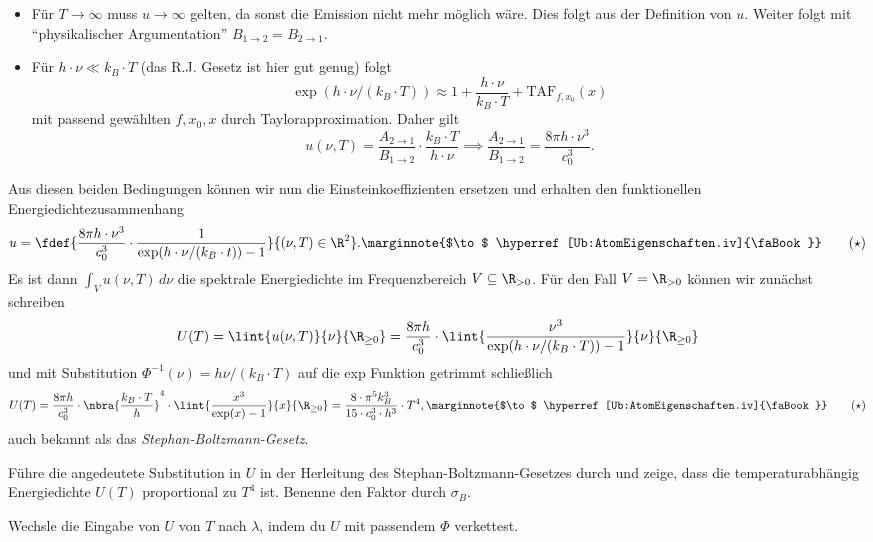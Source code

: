 \documentclass{article}
\begin{document}
    \begin{itemize}
        \item Für $T\to\infty$ muss $u\to\infty$ gelten, da sonst die Emission nicht mehr möglich wäre. Dies folgt aus der Definition von $u$. Weiter folgt mit \enquote{physikalischer Argumentation} $B_{1\to 2} = B_{2\to 1}$.
        \item Für $h\cdot\nu \ll k_B\cdot T$ (das R.J. Gesetz ist hier gut genug) folgt 
        \[
            \exp(h\cdot\nu / (k_B\cdot T))\approx 1+\frac{h\cdot\nu}{k_B\cdot T}+\text{TAF}_{f,x_0}(x)
        \]
        mit passend gewählten $f,x_0,x$ durch Taylorapproximation. Daher gilt
        \[
            u(\nu,T) = \frac{A_{2\to 1}}{B_{1\to 2}}\cdot\frac{k_B\cdot T}{h\cdot\nu}\implies\frac{A_{2\to 1}}{B_{1\to 2}} = \frac{8\pi h\cdot\nu^3}{c_0^3}.
        \]
    \end{itemize}
    Aus diesen beiden Bedingungen können wir nun die Einsteinkoeffizienten ersetzen und erhalten den funktionellen Energiedichtezusammenhang
    \begin{align*}
        u = \fdef{\frac{8\pi h\cdot\nu^3}{c_0^3} \cdot\frac{1}{\exp(h\cdot\nu /(k_B\cdot t)) - 1}}{(\nu,T)\in\R^2}.
        \label{eq:PlanckEnergieDichte}\marginnote{$\to$ \hyperref[Ub:AtomEigenschaften.iv]{\faBook}}\tag{$\star$}
    \end{align*}
    Es ist dann $\int_V u(\nu,T)\, d\nu$ die spektrale Energiedichte im Frequenzbereich $V\subseteq\R_{>0}$. Für den Fall $V = \R_{>0}$ können wir zunächst schreiben 
    \[
        U(T) = \lint{u(\nu,T)}{\nu}{\R_{\geq 0}} = \frac{8\pi h}{c_0^3}\cdot\lint{\frac{\nu^3}{\exp(h\cdot\nu/(k_B\cdot T)) - 1}}{\nu}{\R_{\geq 0}}
    \]
    und mit Substitution $\Phi^{-1}(\nu) = h\nu / (k_B\cdot T)$ auf die exp Funktion getrimmt schließlich 
    \begin{align*}
        U(T) = \frac{8\pi h}{c_0^3} \cdot\nbra{\frac{k_B\cdot T}{h}}^4\cdot\lint{\frac{x^3}{\exp(x)-1}}{x}{\R_{\geq 0}} = \frac{8\cdot\pi^5 k_B^3}{15\cdot c_0^3\cdot h^3}\cdot T^4,\label{eq:StephanBoltzmann}\marginnote{$\to$ \hyperref[Ub:AtomEigenschaften.iv]{\faBook}}\tag{$\star$}
    \end{align*}
    auch bekannt als das \emph{Stephan-Boltzmann-Gesetz}.
    \begin{Aufgabe}
        \nr{} Führe die angedeutete Substitution in $U$ in der Herleitung des Stephan-Boltzmann-Gesetzes durch und zeige, dass die temperaturabhängig Energiedichte $U(T)$ proportional zu $T^4$ ist. Benenne den Faktor durch $\sigma_B$. 
        
        \nr{} Wechsle die Eingabe von $U$ von $T$ nach $\lambda$, indem du $U$ mit passendem $\Phi$ verkettest.
    \end{Aufgabe}
\end{document}

